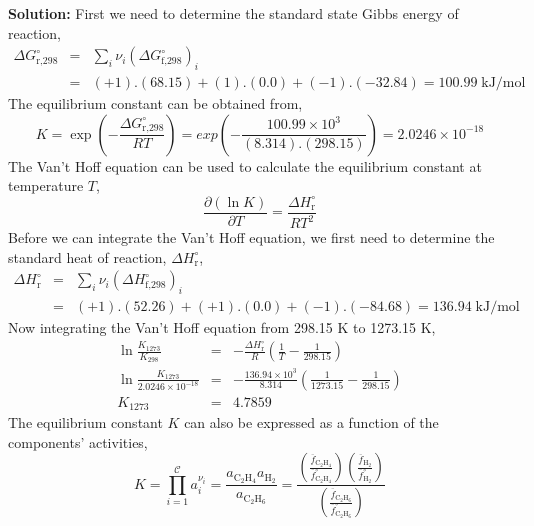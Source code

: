 \documentclass[12pts,a4paper,amsmath,amssymb,floatfix]{article}%
\newcommand{\frc}{\displaystyle\frac}
\newcounter{reaction}
\begin{document}
\begin{enumerate}[1)]
{\bf Solution:} First we need to determine the standard state Gibbs energy of reaction,
         \begin{eqnarray}
             \Delta G^{\circ}_{\text{r,298}} &=& \sum\limits_{i}\nu_{i}\left(\Delta G^{\circ}_{\text{f,298}}\right)_{i} \nonumber \\
                                     &=& (+1).(68.15)+ (1).(0.0) + (-1).(-32.84) = 100.99\; \text{kJ/mol} \nonumber
         \end{eqnarray}
       The equilibrium constant can be obtained from,
         \begin{displaymath}
            K = \exp\left(-\frc{\Delta G^{\circ}_{\text{r,298}}}{RT}\right) = exp\left(-\frc{100.99\times 10^{3}}{(8.314).(298.15)}\right) = 2.0246\times 10^{-18}
         \end{displaymath}
       The Van't Hoff equation can be used to calculate the equilibrium constant at temperature $T$,
         \begin{displaymath}
            \frc{\partial\left(\ln K\right)}{\partial T} = \frc{\Delta H^{\circ}_{\text{r}}}{RT^{2}}
         \end{displaymath}
       Before we can integrate the Van't Hoff equation, we first need to determine the standard heat of reaction, $\Delta H^{\circ}_{\text{r}}$,
         \begin{eqnarray}
            \Delta H^{\circ}_{\text{r}} &=& \sum\limits_{i} \nu_{i}\left(\Delta H^{\circ}_{\text{f,298}}\right)_{i} \nonumber \\
                                 &=& (+1).(52.26) + (+1).(0.0) + (-1).(-84.68) = 136.94\;\text{kJ/mol}\nonumber
         \end{eqnarray}
       Now integrating the Van't Hoff equation from 298.15 K to 1273.15 K,
         \begin{eqnarray}
            \ln\frc{K_{1273}}{K_{298}} &=& -\frc{\Delta H^{\circ}_{\text{r}}}{R}\left(\frc{1}{T}-\frc{1}{298.15}\right) \nonumber \\
            \ln\frc{K_{1273}}{2.0246\times 10^{-18}} &=& -\frc{136.94\times 10^{3}}{8.314}\left(\frc{1}{1273.15}-\frc{1}{298.15}\right) \nonumber \\
            K_{1273} &=& 4.7859 \nonumber
         \end{eqnarray} 
       The equilibrium constant $K$ can also be expressed as a function of the components' activities,
         \begin{displaymath}
            K = \prod\limits_{i=1}^{\mathcal{C}} a_{i}^{\nu_{i}} = \frc{a_{\text{C}_{2}\text{H}_{4}}a_{\text{H}_{2}}}{a_{\text{C}_{2}\text{H}_{6}}} = \frc{\left(\frc{\overline{f}_{\text{C}_{2}\text{H}_{4}}}{\overline{f}^{\circ}_{\text{C}_{2}\text{H}_{4}}}\right)\left(\frc{\overline{f}_{\text{H}_{2}}}{\overline{f}^{\circ}_{\text{H}_{2}}}\right)}{\left(\frc{\overline{f}_{\text{C}_{2}\text{H}_{6}}}{\overline{f}^{\circ}_{\text{C}_{2}\text{H}_{6}}}\right)}

\end{displaymath}
\end{enumerate}
\end{document}
